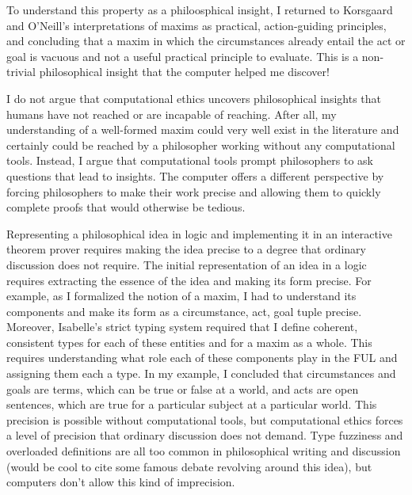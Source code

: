 \begin{isabellebody}
\begin{isamarkuptext}
To understand this property as a philoosphical insight, I returned to Korsgaard and O'Neill's 
interpretations of maxims as practical, action-guiding principles, and concluding that a maxim in 
which the circumstances already entail the act or goal is vacuous and not a useful practical principle 
to evaluate. This is a non-trivial philosophical insight that the computer helped me discover!%
\end{isamarkuptext}\isamarkuptrue%
%
\isadelimdocument
%
\endisadelimdocument
%
\isatagdocument
%
\isamarkuptrue%
%
\endisatagdocument
{\isafolddocument}%
%
\isadelimdocument
%
\endisadelimdocument
%
\begin{isamarkuptext}%
I do not argue that computational ethics uncovers philosophical insights that humans have not reached 
or are incapable of reaching. After all, my understanding of a well-formed maxim could 
very well exist in the literature and certainly could be reached by a philosopher working without any 
computational tools. Instead, I argue that computational tools prompt philosophers to ask questions that 
lead to insights. The computer offers a different perspective by forcing philosophers to make their 
work precise and allowing them to quickly complete proofs that would otherwise be tedious.

Representing a philosophical idea in logic and implementing it in an interactive theorem prover requires 
making the idea precise to a degree that ordinary discussion does not require. The initial representation 
of an idea in a logic requires extracting the essence of the idea and making its form precise. For example, 
as I formalized the notion of a maxim, I had to understand its components and make its form as a 
circumstance, act, goal tuple precise. Moreover, Isabelle's strict typing system required that I define 
coherent, consistent types for each of these entities and for a maxim as a whole. This requires understanding 
what role each of these components play in the FUL and assigning them each a type. In my example, I 
concluded that circumstances and goals are terms, which can be true or false at a world, and acts are 
open sentences, which are true for a particular subject at a particular world. This precision is possible 
without computational tools, but computational ethics forces a level of precision that ordinary discussion 
does not demand. Type fuzziness and overloaded definitions are all too common in philosophical writing and 
discussion (would be cool to cite some famous debate revolving around this idea), but computers don't 
allow this kind of imprecision.


\end{isamarkuptext}
\end{isabellebody}

